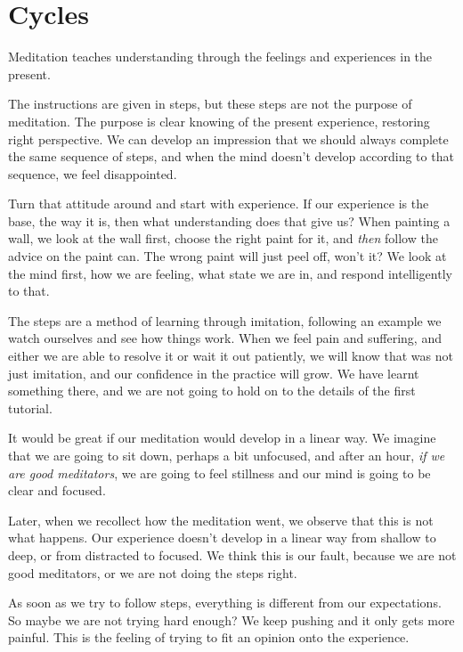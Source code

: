 \hypertarget{cycles-1}{%
\chapter{Cycles}\label{cycles-1}}

Meditation teaches understanding through the feelings and experiences in
the present.

The instructions are given in steps, but these steps are not the purpose
of meditation. The purpose is clear knowing of the present experience,
restoring right perspective. We can develop an impression that we should
always complete the same sequence of steps, and when the mind doesn't
develop according to that sequence, we feel disappointed.

Turn that attitude around and start with experience. If our experience
is the base, the way it is, then what understanding does that give us?
When painting a wall, we look at the wall first, choose the right paint
for it, and \emph{then} follow the advice on the paint can. The wrong
paint will just peel off, won't it? We look at the mind first, how we
are feeling, what state we are in, and respond intelligently to that.

The steps are a method of learning through imitation, following an
example we watch ourselves and see how things work. When we feel pain
and suffering, and either we are able to resolve it or wait it out
patiently, we will know that was not just imitation, and our confidence
in the practice will grow. We have learnt something there, and we are
not going to hold on to the details of the first tutorial.

It would be great if our meditation would develop in a linear way. We
imagine that we are going to sit down, perhaps a bit unfocused, and
after an hour, \emph{if we are good meditators}, we are going to feel
stillness and our mind is going to be clear and focused.

Later, when we recollect how the meditation went, we observe that this
is not what happens. Our experience doesn't develop in a linear way from
shallow to deep, or from distracted to focused. We think this is our
fault, because we are not good meditators, or we are not doing the steps
right.

As soon as we try to follow steps, everything is different from our
expectations. So maybe we are not trying hard enough? We keep pushing
and it only gets more painful. This is the feeling of trying to fit an
opinion onto the experience.

